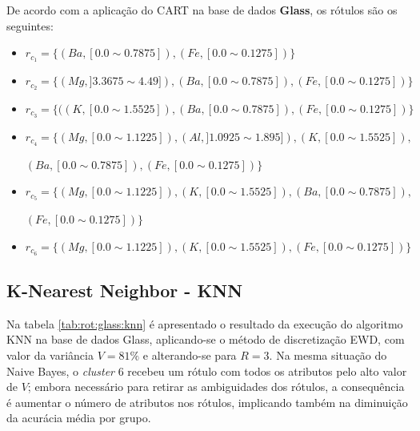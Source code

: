 De acordo com a aplicação do CART na base de dados \textbf{Glass}, os rótulos são os seguintes:
\begin{itemize}[noitemsep]
 \item ${r_{c_1}=\{ (Ba,[ 0.0 \sim 0.7875 ] ),(Fe,[ 0.0 \sim 0.1275 ] ) \} }$  
 \item ${r_{c_2}=\{ (Mg,] 3.3675 \sim  4.49 ] ),(Ba,[ 0.0 \sim 0.7875 ] ),(Fe,[ 0.0 \sim 0.1275 ] ) \} }$
 \item ${r_{c_3}=\{ ((K,[ 0.0 \sim 1.5525 ] ),(Ba,[ 0.0 \sim 0.7875 ] ),(Fe,[ 0.0 \sim 0.1275 ] )  \} }$  
 \item ${r_{c_4}=\{ (Mg,[ 0.0 \sim  1.1225 ] ),(Al,] 1.0925 \sim 1.895 ] ), (K,[ 0.0 \sim 1.5525 ] ),}$

 ${ (Ba,[ 0.0 \sim 0.7875 ] ),(Fe,[ 0.0 \sim 0.1275 ] ) \} }$
 \item ${r_{c_5}=\{ (Mg,[ 0.0 \sim  1.1225 ] ), (K,[ 0.0 \sim 1.5525 ]  ),(Ba,[ 0.0 \sim 0.7875 ] ), }$
 
 ${ (Fe,[ 0.0 \sim 0.1275 ] ) \} }$
 \item ${r_{c_6}=\{ (Mg,[ 0.0 \sim  1.1225  ] ),  (K,[ 0.0 \sim 1.5525] ),(Fe,[ 0.0 \sim 0.1275 ] ) \} }$
\end{itemize}



\subsection{K-Nearest Neighbor - KNN} \label{cap:resultados:ssec:glass:knn}



Na tabela \ref{tab:rot:glass:knn} é apresentado o resultado da execução do algoritmo KNN na base de dados Glass, aplicando-se o método de discretização EWD, com valor da variância ${V=81\%}$ e alterando-se para ${R=3}$. Na mesma situação do Naive Bayes, o \textit{cluster} 6 recebeu um rótulo com todos os atributos pelo alto valor de ${V}$; embora necessário para retirar as ambiguidades dos rótulos, a consequência é aumentar o número de atributos nos rótulos, implicando também na diminuição da acurácia média por grupo. 


